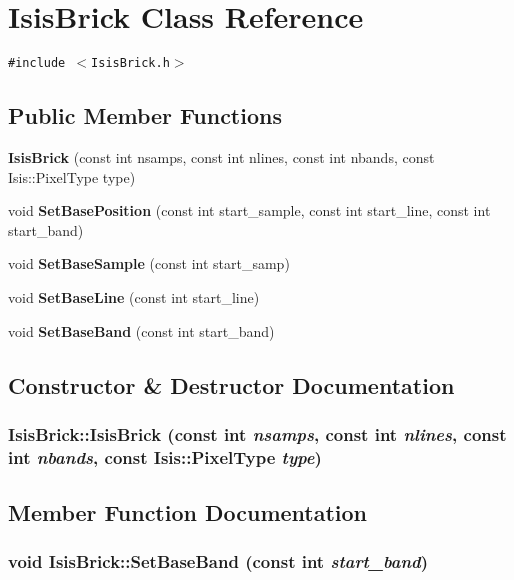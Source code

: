 \section{Isis\-Brick Class Reference}
\label{classIsisBrick}
{\tt \#include $<$Isis\-Brick.h$>$}

\subsection*{Public Member Functions}
\begin{CompactItemize}
\item 
{\bf Isis\-Brick} (const int nsamps, const int nlines, const int nbands, const Isis::Pixel\-Type type)
\item 
void {\bf Set\-Base\-Position} (const int start\_\-sample, const int start\_\-line, const int start\_\-band)
\item 
void {\bf Set\-Base\-Sample} (const int start\_\-samp)
\item 
void {\bf Set\-Base\-Line} (const int start\_\-line)
\item 
void {\bf Set\-Base\-Band} (const int start\_\-band)
\end{CompactItemize}


\subsection{Constructor \& Destructor Documentation}
\subsubsection{\setlength{\rightskip}{0pt plus 5cm}Isis\-Brick::Isis\-Brick (const int {\em nsamps}, const int {\em nlines}, const int {\em nbands}, const Isis::Pixel\-Type {\em type})\hspace{0.3cm}{\tt  [inline]}}\label{classIsisBrick_a0}




\subsection{Member Function Documentation}
\subsubsection{\setlength{\rightskip}{0pt plus 5cm}void Isis\-Brick::Set\-Base\-Band (const int {\em start\_\-band})\hspace{0.3cm}{\tt  [inline]}}\label{classIsisBrick_a4}


